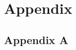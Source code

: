 \documentclass[advisory-ia.tex]{subfiles}
\begin{document}
\section{Appendix}
\subsection{Appendix A}
\label{appendix:a}

\end{document}
